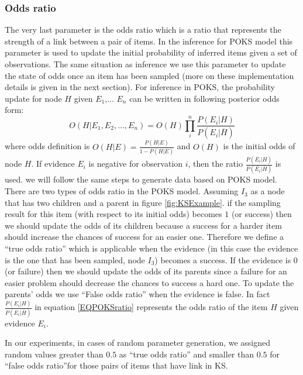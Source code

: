 \subsubsection{Odds ratio}

The very last parameter is the odds ratio which is a ratio that represents the strength of a link between a pair of items. In the inference for POKS model this parameter is used to update the initial probability of inferred items given a set of observations. The same situation as inference we use this parameter to update the state of odds once an item has been sampled (more on these implementation details is given in the next section).
For inference in POKS, the probability update for node $H$ given $E_1$,... $E_n$ can be written in following posterior odds form:
\begin{equation}
O(H|E_1,E_2, ... , E_n) = O(H) \prod_{i}^{n} \frac{P(E_i|H)}{P(E_i | \overline{H})}
\label{EQPOKSratio}
\end{equation}
where odds definition is $O(H|E) = \frac{P(H|E)}{1-P(H|E)}$ and $O(H)$ is the initial odds of node $H$. If evidence $E_i$ is negative for observation $i$, then the ratio $\frac{P(\overline{E_i}|H)}{P(\overline{E_i}|\overline{H})}$ is used. we will follow the same steps to generate data based on POKS model. 
There are two types of odds ratio in the POKS model. Assuming $I_{3}$ as a node that has two children and a parent in figure \ref{fig:KSExample}. if the sampling result for this item (with respect to its initial odds) becomes $1$ (or success) then we should update the odds of its children because a success for a harder item should increase the chances of success for an easier one. Therefore we define a ``true odds ratio'' which is applicable when the evidence (in this case the evidence is the one that has been sampled,  node $I_{3}$) becomes a success. If the evidence is $0$ (or failure) then we should update the odds of its parents since a failure for an easier problem should decrease the chances to success a hard one. To update the parents' odds we use ``False odds ratio'' when the evidence is false. In fact $\frac{P(E_i|H)}{P(E_i | \overline{H})}$ in equation \ref{EQPOKSratio} represents the odds ratio of the item $H$ given evidence $E_i$. 

In our experiments, in cases of random parameter generation, we assigned random values greater than $0.5$ as ``true odds ratio'' and smaller than $0.5$ for ``false odds ratio''for those pairs of items that have link in KS.

